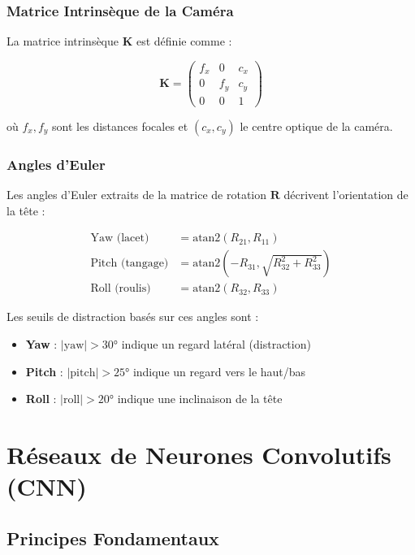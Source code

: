 \subsubsection{Matrice Intrinsèque de la Caméra}

La matrice intrinsèque $\mathbf{K}$ est définie comme :

\begin{equation}
\mathbf{K} = \begin{pmatrix} f_x & 0 & c_x \\ 0 & f_y & c_y \\ 0 & 0 & 1 \end{pmatrix}
\label{eq:camera_matrix}
\end{equation}

où $f_x, f_y$ sont les distances focales et $(c_x, c_y)$ le centre optique de la caméra.

\subsubsection{Angles d'Euler}

Les angles d'Euler extraits de la matrice de rotation $\mathbf{R}$ décrivent l'orientation de la tête :

\begin{align}
\text{Yaw (lacet)} &= \text{atan2}(R_{21}, R_{11}) \label{eq:yaw} \\
\text{Pitch (tangage)} &= \text{atan2}(-R_{31}, \sqrt{R_{32}^2 + R_{33}^2}) \label{eq:pitch} \\
\text{Roll (roulis)} &= \text{atan2}(R_{32}, R_{33}) \label{eq:roll}
\end{align}

Les seuils de distraction basés sur ces angles sont :
\begin{itemize}
    \item \textbf{Yaw} : $|\text{yaw}| > 30°$ indique un regard latéral (distraction)
    \item \textbf{Pitch} : $|\text{pitch}| > 25°$ indique un regard vers le haut/bas
    \item \textbf{Roll} : $|\text{roll}| > 20°$ indique une inclinaison de la tête
\end{itemize}

\section{Réseaux de Neurones Convolutifs (CNN)}

\subsection{Principes Fondamentaux}


